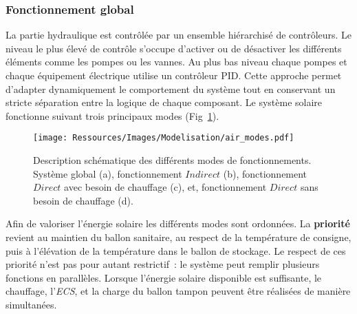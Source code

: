 \subsubsection{Fonctionnement global} %
\label{ssub:fonctionnement_global}
La partie hydraulique est contrôlée par un ensemble hiérarchisé de contrôleurs. Le niveau
le plus élevé de contrôle s’occupe d’activer ou de désactiver les différents éléments
comme les pompes ou les vannes. Au plus bas niveau chaque pompes et chaque équipement
électrique utilise un contrôleur PID. Cette approche permet d’adapter dynamiquement le
comportement du système tout en conservant un stricte séparation entre la logique de
chaque composant. Le système solaire fonctionne suivant trois principaux modes
(Fig~\ref{fig:schema_modes}).
\begin{figure}
    \begin{center}
        \texttt{[image: Ressources/Images/Modelisation/air\_modes.pdf]}
    \end{center}
    \caption{Description schématique des différents modes de fonctionnements. Système
    global (a), fonctionnement $Indirect$ (b), fonctionnement $Direct$ avec besoin de
    chauffage (c), et, fonctionnement $Direct$ sans besoin de chauffage (d).
             \label{fig:schema_modes}}
\end{figure}

Afin de valoriser l’énergie solaire les différents modes sont ordonnées. La \textbf{priorité} revient au maintien du ballon
sanitaire, au respect de la température de consigne, puis à l’élévation de la température
dans le ballon de stockage. Le respect de ces priorité n’est pas pour autant restrictif~:
le système peut remplir plusieurs fonctions en parallèles. Lorsque l’énergie solaire
disponible est suffisante, le chauffage, l’\emph{ECS}, et la charge du ballon tampon
peuvent être réalisées de manière simultanées.


